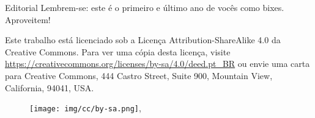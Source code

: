 \begin{editorial}{Editorial}
Lembrem-se: este é o primeiro e último ano de vocês como bixes. Aproveitem!


Este trabalho está licenciado sob a Licença Attribution-ShareAlike 4.0 da
Creative Commons. Para ver uma cópia desta licença, visite
\url{https://creativecommons.org/licenses/by-sa/4.0/deed.pt_BR} ou envie
uma carta para Creative Commons, 444 Castro Street, Suite 900, Mountain View,
California, 94041, USA.
\\
\begin{figure}[H]
    \centering
    \texttt{[image: img/cc/by-sa.png]},
\end{figure}

\end{editorial}
